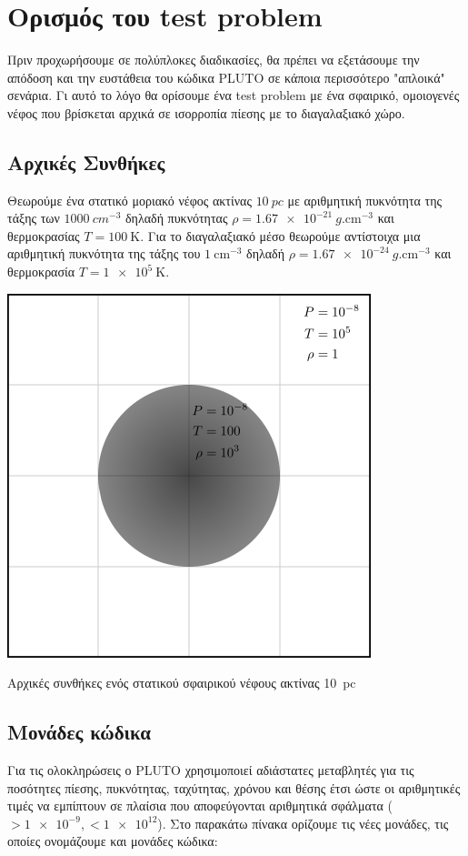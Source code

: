 	\section{Ορισμός του test problem}
	Πριν προχωρήσουμε σε πολύπλοκες διαδικασίες, θα πρέπει να εξετάσουμε την απόδοση και την ευστάθεια του κώδικα PLUTO σε κάποια περισσότερο "απλοικά" σενάρια. Γι αυτό το λόγο θα ορίσουμε ένα test problem με ένα σφαιρικό, ομοιογενές νέφος που βρίσκεται αρχικά σε ισορροπία πίεσης με το διαγαλαξιακό χώρο. 
	
	\subsection{Αρχικές Συνθήκες}
	\label{par:InitialConditions}
	Θεωρούμε ένα στατικό μοριακό νέφος ακτίνας $\SI{10} {pc}$ με αριθμητική πυκνότητα
	της τάξης των $\SI{1000}{cm^{-3}}$ δηλαδή πυκνότητας $\rho=\SI{1.67e-21}{g. \cm^{-3}}$ και θερμοκρασίας $T=\SI{100}{\kelvin}$.
	Για το διαγαλαξιακό μέσο θεωρούμε αντίστοιχα μια αριθμητική πυκνότητα της τάξης του 
	$\SI{1}{\cm^{-3}}$ δηλαδή $\rho=\SI{1.67e-24}{g. \cm^{-3}}$ και θερμοκρασία $T=\SI{1e5}{\kelvin}$.

			\begin{marginfigure}
				\centering
				\includegraphics[width=0.7\linewidth]{Images/rect4578.png}
				\caption{Αρχικές συνθήκες ενός στατικού σφαιρικού νέφους ακτίνας \SI{10}{pc}}
				\label{fig:rect4578}
			\end{marginfigure}
		

	
	\subsection{Μονάδες κώδικα}
	Για τις ολοκληρώσεις ο PLUTO χρησιμοποιεί αδιάστατες μεταβλητές για τις ποσότητες πίεσης, πυκνότητας, ταχύτητας, χρόνου και θέσης έτσι ώστε οι αριθμητικές τιμές να εμπίπτουν σε πλαίσια που αποφεύγονται αριθμητικά σφάλματα ($>\num{1e-9},<\num{1e12}$). Στο παρακάτω πίνακα ορίζουμε τις νέες μονάδες, τις οποίες ονομάζουμε και μονάδες κώδικα: 
	
